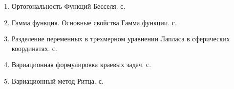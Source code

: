 \begin{enumerate}
\item Ортогональность Функций Бесселя. с.~\pageref{que:32}\\
\item Гамма функция. Основные свойства Гамма функции. с.~\pageref{que:33}\\
\item Разделение переменных в трехмерном уравнении Лапласа в сферических координатах. с.~\pageref{que:34}\\
\item Вариационная формулировка краевых задач. с.~\pageref{que:35}\\
\item Вариационный метод Ритца. с.~\pageref{que:36}\\
\end{enumerate}


